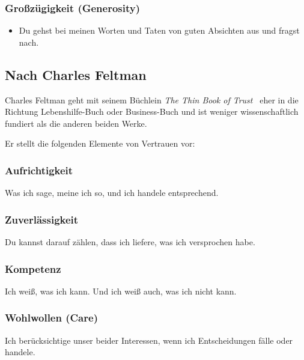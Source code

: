 \subsubsection{Großzügigkeit (Generosity)}

\begin{itemize}
    \item \glqq Du gehst bei meinen Worten und Taten von guten Absichten aus und fragst nach.\grqq
\end{itemize}

\subsection{Nach Charles Feltman}

Charles Feltman geht mit seinem Büchlein \emph{The Thin Book of Trust}~\cite{thin-book-of-trust} eher in die Richtung Lebenshilfe-Buch oder Business-Buch und ist weniger wissenschaftlich fundiert als die anderen beiden Werke.

Er stellt die folgenden Elemente von Vertrauen vor:

\subsubsection{Aufrichtigkeit}

\glqq Was ich sage, meine ich so, und ich handele entsprechend.\grqq

\subsubsection{Zuverlässigkeit}

\glqq Du kannst darauf zählen, dass ich liefere, was ich versprochen habe.\grqq

\subsubsection{Kompetenz}

\glqq Ich weiß, was ich kann. Und ich weiß auch, was ich nicht kann.\grqq

\subsubsection{Wohlwollen (Care)}

\glqq Ich berücksichtige unser beider Interessen, wenn ich Entscheidungen fälle oder handele.\grqq

